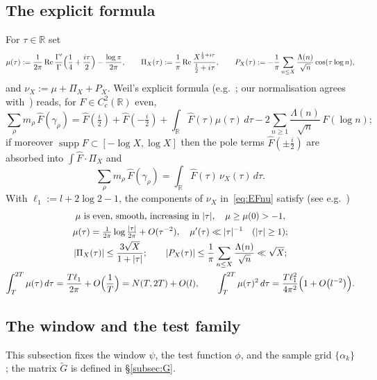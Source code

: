 \documentclass[11pt]{amsart}
\theoremstyle{definition}
\theoremstyle{remark}
\numberwithin{equation}{section}
\DeclareMathOperator{\supp}{supp}
\DeclareMathOperator{\re}{Re}
\newcommand{\RR}{\mathbb{R}}
\newcommand{\wh}{\widehat}
\newcommand{\Gt}{\widetilde{G}}
\newcommand{\dd}{\,d}
\begin{document}
\subsection{The explicit formula}\label{subsec:EF}

For $\tau\in\RR$ set
\[
\mu(\tau):=\frac1{2\pi}\re\frac{\Gamma'}{\Gamma}\Bigl(\frac14+\frac{i\tau}2\Bigr)-\frac{\log\pi}{2\pi},
\qquad
\Pi_X(\tau):=\frac1\pi\re\frac{X^{\frac12+i\tau}}{\tfrac12+i\tau},
\qquad
P_X(\tau):=-\frac1\pi\sum_{n\le X}\frac{\Lambda(n)}{\sqrt n}\cos(\tau\log n),
\]
and $\nu_X:=\mu+\Pi_X+P_X$. Weil's explicit formula (e.g.\ \cite[\S5.5]{IK04}; our normalisation agrees with~\cite{BGSTB24}) reads, for $F\in C_c^2(\RR)$ even,
\begin{equation}\label{eq:EF}
\sum_\rho m_\rho\,\wh F(\gamma_\rho)=\wh F(\tfrac i2)+\wh F(-\tfrac i2)+\int_\RR\wh F(\tau)\mu(\tau)\dd\tau-2\sum_{n\ge1}\frac{\Lambda(n)}{\sqrt n}\,F(\log n);
\end{equation}
if moreover $\supp F\subset[-\log X,\log X]$ then the pole terms $\wh F(\pm\tfrac i2)$ are absorbed into $\int\wh F\cdot\Pi_X$ and
\begin{equation}\label{eq:EFnu}
\sum_\rho m_\rho\,\wh F(\gamma_\rho)=\int_\RR\wh F(\tau)\,\nu_X(\tau)\dd\tau.
\end{equation}
With $\ell_1:=l+2\log2-1$, the components of $\nu_X$ in~\eqref{eq:EFnu} satisfy (see e.g.\ \cite[\S5.5]{IK04})
\begin{gather}
\mu \text{ is even, smooth, increasing in }|\tau|,\quad \mu\ge\mu(0)>-1,\notag\\
\mu(\tau)=\tfrac1{2\pi}\log\tfrac{|\tau|}{2\pi}+O(\tau^{-2}),\quad \mu'(\tau)\ll|\tau|^{-1}\quad (|\tau|\ge1);\label{eq:mufacts}\\
|\Pi_X(\tau)|\le \frac{3\sqrt X}{1+|\tau|};\qquad |P_X(\tau)|\le\frac1\pi\sum_{n\le X}\frac{\Lambda(n)}{\sqrt n}\ll\sqrt X ;\label{eq:PiPfacts}\\
\int_T^{2T}\mu(\tau)\dd\tau=\frac{T\ell_1}{2\pi}+O\Bigl(\frac1T\Bigr)=N(T,2T)+O(l),\qquad
\int_T^{2T}\mu(\tau)^2\dd\tau=\frac{T\ell_1^2}{4\pi^2}\Bigl(1+O\bigl(l^{-2}\bigr)\Bigr).\label{eq:muints}
\end{gather}

\subsection{The window and the test family}\label{subsec:family}

This subsection fixes the window $\psi$, the test function $\phi$, and the sample grid $\{\alpha_k\}$; the matrix $\Gt$ is defined in \S\ref{subsec:G}.
\end{document}
